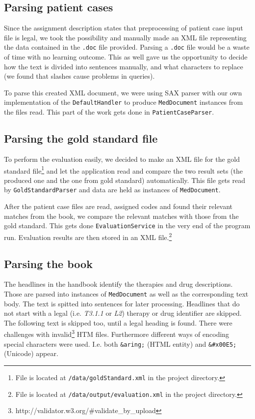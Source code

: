 \documentclass{article}
\begin{document}
\subsection{Parsing patient cases}

Since the assignment description states that preprocessing of patient case input file is legal, we took the possibility and manually made an XML file representing the data contained in the \texttt{.doc} file provided. Parsing a \texttt{.doc} file would be a waste of time with no learning outcome. This as well gave us the opportunity to decide how the text is divided into sentences manually, and what characters to replace (we found that slashes cause problems in queries).

To parse this created XML document, we were using SAX parser with our own implementation of the \texttt{DefaultHandler} to produce \texttt{MedDocument} instances from the files read. This part of the work gets done in \texttt{PatientCaseParser}.

\subsection{Parsing the gold standard file}

To perform the evaluation easily, we decided to make an XML file for the gold standard file\footnote{File is located at \texttt{/data/goldStandard.xml} in the project directory.} and let the application read and compare the two result sets (the produced one and the one from gold standard) automatically. This file gets read by \texttt{GoldStandardParser} and data are held as instances of \texttt{MedDocument}.

After the patient case files are read, assigned codes and found their relevant matches from the book, we compare the relevant matches with those from the gold standard. This gets done \texttt{EvaluationService} in the very end of the program run. Evaluation results are then stored in an XML file.\footnote{File is located at \texttt{/data/output/evaluation.xml} in the project directory.}

\subsection{Parsing the book}

The headlines in the handbook identify the therapies and drug descriptions. Those are parsed into instances of \texttt{MedDocument} as well as the corresponding text body. The text is spitted into sentences for later processing. Headlines that do not start with a legal (i.e. \textit{T3.1.1} or \textit{L2}) therapy or drug identifier are skipped. The following text is skipped too, until a legal heading is found.
There were challenges with invalid\footnote{http://validator.w3.org/\#validate\_by\_upload} HTM files. Furthermore different ways of encoding special characters were used. I.e. both \texttt{\&aring;} (HTML entity) and \texttt{\&\#x00E5;} (Unicode) appear.
\end{document}
